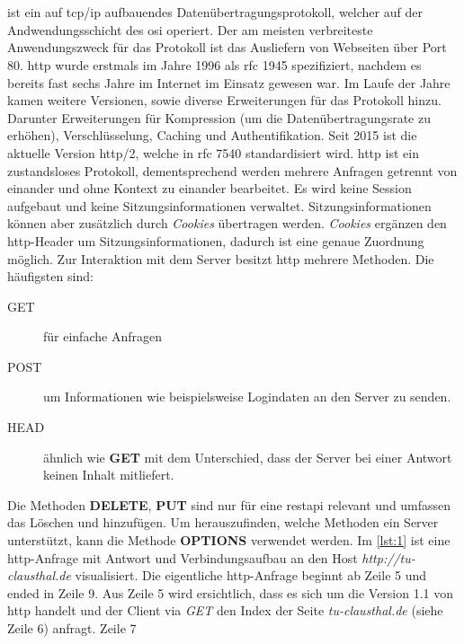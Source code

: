 \documentclass[titlepage]{report}
\begin{document}
\section*{}
 ist ein auf \gls{tcp}/\gls{ip} aufbauendes
Datenübertragungsprotokoll, welcher auf der Andwendungsschicht des
\gls{osi} operiert. Der am meisten verbreiteste Anwendungszweck für das
Protokoll ist das Ausliefern von Webseiten über Port 80. \gls{http}
wurde erstmals im Jahre 1996 als \gls{rfc} 1945 spezifiziert, nachdem
es bereits fast sechs Jahre im Internet im Einsatz gewesen
war\cite{RFC1945}. Im Laufe der Jahre kamen weitere Versionen,
sowie diverse Erweiterungen für das Protokoll hinzu. Darunter
Erweiterungen für Kompression (um die Datenübertragungsrate zu erhöhen),
Verschlüsselung, Caching und Authentifikation. Seit 2015 ist die
aktuelle Version \gls{http}/2, welche in \gls{rfc} 7540 standardisiert
wird\cite{RFC7540}. \gls{http} ist ein zustandsloses Protokoll,
dementsprechend werden mehrere Anfragen getrennt von einander und ohne
Kontext zu einander bearbeitet. Es wird keine Session aufgebaut und
keine Sitzungsinformationen verwaltet. Sitzungsinformationen können
aber zusätzlich durch \emph{Cookies} übertragen werden. \emph{Cookies}
ergänzen den \gls{http}\hyp{}Header um Sitzungsinformationen, dadurch
ist eine genaue Zuordnung möglich. Zur Interaktion mit dem Server
besitzt \gls{http} mehrere Methoden. Die häufigsten sind:
\begin{description}
    \item[GET] für einfache Anfragen
    \item[POST] um Informationen wie beispielsweise Logindaten an den
        Server zu senden.
    \item[HEAD] ähnlich wie \textbf{GET} mit dem Unterschied, dass
        der Server bei einer Antwort keinen Inhalt mitliefert.
\end{description}
Die Methoden \textbf{DELETE}, \textbf{PUT} sind nur für eine
\gls{restapi} relevant und umfassen das Löschen und hinzufügen. Um
herauszufinden, welche Methoden ein Server unterstützt, kann die Methode
\textbf{OPTIONS} verwendet werden.
Im \autoref{lst:1} ist eine \gls{http}\hyp{}Anfrage mit Antwort und
Verbindungsaufbau an den Host \emph{http://tu-clausthal.de}
visualisiert. Die eigentliche \gls{http}\hyp{}Anfrage beginnt ab Zeile 5
und ended in Zeile 9. Aus Zeile 5 wird ersichtlich, dass es sich um die
Version 1.1 von \gls{http} handelt und der Client via \emph{GET} den
Index der Seite \emph{tu-clausthal.de} (siehe Zeile 6) anfragt. Zeile 7
\end{document}
